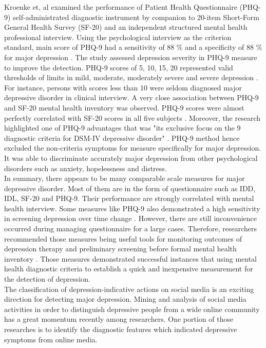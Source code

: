 \documentclass[12pt]{article}
\begin{document}
Kroenke et, al \cite{Kroenke} examined the performance of Patient Health Questionnaire (PHQ-9) self-administrated diagnostic instrument by companion to 20-item Short-Form General Health Survey (SF-20) and an independent structured mental health professional interview. Using the psychological interview as the criterion standard, main score of PHQ-9 had a sensitivity of 88 \% and a specificity of 88 \% for major depression \cite{Kroenke}. The study assessed depression severity in PHQ-9 measure to improve the detection.  PHQ-9 scores of 5, 10, 15, 20 represented valid thresholds of limits in mild, moderate, moderately severe and severe depression \cite{Kroenke}. For instance, persons with scores less than 10 were seldom diagnosed major depressive disorder in clinical interview. A very close association between PHQ-9 and SF-20 mental health inventory was observed. PHQ-9 scores were almost perfectly correlated with SF-20 scores in all five subjects \cite{Kroenke}. Moreover, the research highlighted one of PHQ-9 advantages that was "its exclusive focus on the 9 diagnostic criteria for DSM-IV depressive disorder" \cite{Kroenke}. PHQ-9 method hence excluded the non-criteria symptoms for measure specifically for major depression. It was able to discriminate accurately major depression from other psychological disorders such as anxiety, hopelessness and distress.
\\

In summary, there appears to be many comparable scale measures for major depressive disorder. Most of them are in the form of questionnaire such as IDD, IDL, SF-20 and PHQ-9. Their performance are strongly correlated with mental health interview. Some measures like PHQ-9 also demonstrated a high sensitivity in screening depression over time change \cite{Kroenke}. However, there are still inconvenience occurred during managing questionnaire for a large cases. Therefore, researchers recommended those measures being useful tools for monitoring outcomes of depression therapy \cite{Kroenke} and preliminary screening before formal mental health inventory \cite{Sakado}. Those measures demonstrated successful instances that using mental health diagnostic criteria to establish a quick and inexpensive measurement for the detection of depression.
\\

The classification of depression-indicative actions on social media is an exciting direction for detecting major depression. Mining and analysis of social media activities in order to distinguish depressive people from a wide online community has a great momentum recently among researchers. One portion of those researches is to identify the diagnostic features which indicated depressive symptoms from online media.
\\
\end{document}
